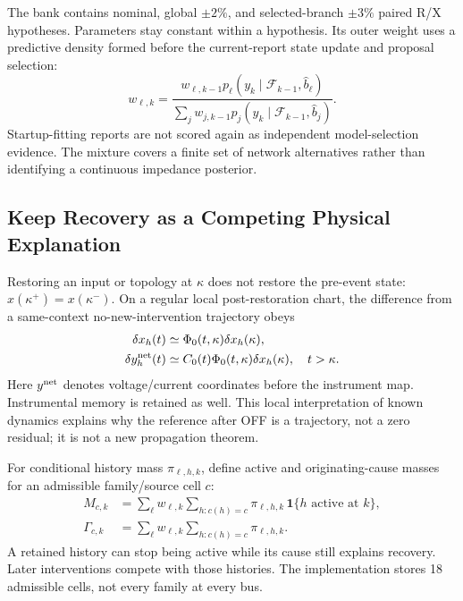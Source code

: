 The bank contains nominal, global $\pm2\%$, and selected-branch $\pm3\%$
paired R/X hypotheses. Parameters stay constant within a hypothesis. Its
outer weight uses a predictive density formed before the current-report
state update and proposal selection:
\begin{equation}
 w_{\ell,k}=\frac{w_{\ell,k-1}p_\ell(y_k\mid\mathcal F_{k-1},\widehat b_\ell)}
 {\sum_jw_{j,k-1}p_j(y_k\mid\mathcal F_{k-1},\widehat b_j)}.
 \label{eq:continuous-weights}
\end{equation}
Startup-fitting reports are not scored again as independent model-selection
evidence. The mixture covers a finite set of network alternatives rather
than identifying a continuous impedance posterior.

\subsection{Keep Recovery as a Competing Physical Explanation}

Restoring an input or topology at $\kappa$ does not restore the pre-event
state: $x(\kappa^+)=x(\kappa^-)$. On a regular local post-restoration chart,
the difference from a same-context no-new-intervention trajectory obeys
\begin{align}
 \delta x_h(t)&\simeq\Phi_0(t,\kappa)\delta x_h(\kappa),\nonumber\\
 \delta y_h^{\rm net}(t)&\simeq C_0(t)\Phi_0(t,\kappa)\delta x_h(\kappa),
 \quad t>\kappa.
 \label{eq:recovery-response}
\end{align}
Here $y^{\rm net}$ denotes voltage/current coordinates before the instrument map.
Instrumental memory is retained as well. This local interpretation of known
dynamics explains why the reference after OFF is a trajectory, not a zero
residual; it is not a new propagation theorem.

For conditional history mass $\pi_{\ell,h,k}$, define active and
originating-cause masses for an admissible family/source cell $c$:
\begin{align}
 M_{c,k}&=\sum_\ell w_{\ell,k}\sum_{h:c(h)=c}
       \pi_{\ell,h,k}\,\mathbf1\{h\text{ active at }k\},\nonumber\\
 \Gamma_{c,k}&=\sum_\ell w_{\ell,k}\sum_{h:c(h)=c}\pi_{\ell,h,k}.
 \label{eq:active-cause-masses}
\end{align}
A retained history can stop being active while its cause still explains
recovery. Later interventions compete with those histories. The
implementation stores 18 admissible cells, not every family at every bus.

